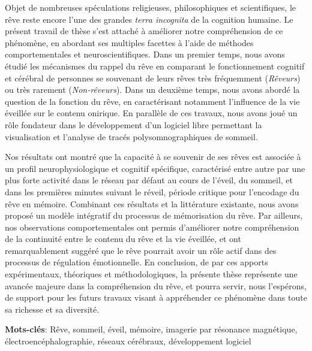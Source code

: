 Objet de nombreuses spéculations religieuses, philosophiques et scientifiques, le rêve reste encore l'une des grandes \emph{terra incognita} de la cognition humaine. Le présent travail de thèse s’est attaché à améliorer notre compréhension de ce phénomène, en abordant ses multiples facettes à l’aide de méthodes comportementales et neuroscientifiques. Dans un premier temps, nous avons étudié les mécanismes du rappel du rêve en comparant le fonctionnement cognitif et cérébral de personnes se souvenant de leurs rêves très fréquemment (\emph{Rêveurs}) ou très rarement (\emph{Non-rêveurs}). Dans un deuxième temps, nous avons abordé la question de la fonction du rêve, en caractérisant notamment l’influence de la vie éveillée sur le contenu onirique. En parallèle de ces travaux, nous avons joué un rôle fondateur dans le développement d’un logiciel libre permettant la visualisation et l’analyse de tracés polysomnographiques de sommeil.

Nos résultats ont montré que la capacité à se souvenir de ses rêves est associée à un profil neurophysiologique et cognitif spécifique, caractérisé entre autre par une plus forte activité dans le réseau par défaut au cours de l’éveil, du sommeil, et dans les premières minutes suivant le réveil, période critique pour l’encodage du rêve en mémoire. Combinant ces résultats et la littérature existante, nous avons proposé un modèle intégratif du processus de mémorisation du rêve. Par ailleurs, nos observations comportementales ont permis d’améliorer notre compréhension de la continuité entre le contenu du rêve et la vie éveillée, et ont remarquablement suggéré que le rêve pourrait avoir un rôle actif dans des processus de régulation émotionnelle. En conclusion, de par ces apports expérimentaux, théoriques et méthodologiques, la présente thèse représente une avancée majeure dans la compréhension du rêve, et pourra servir, nous l’espérons, de support pour les futurs travaux visant à appréhender ce phénomène dans toute sa richesse et sa diversité.

\textbf{Mots-clés}: Rêve, sommeil, éveil, mémoire, imagerie par résonance magnétique, électroencéphalographie, réseaux cérébraux, développement logiciel
